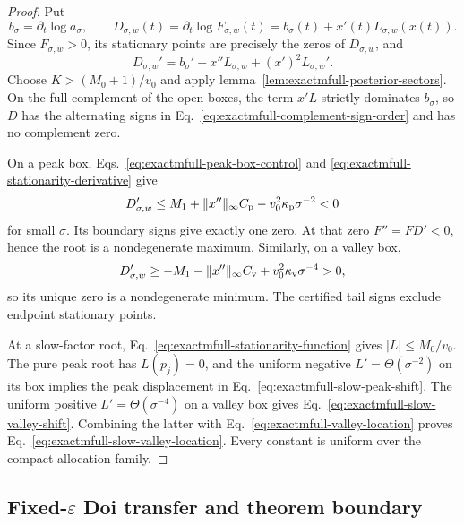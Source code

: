 \documentclass{iopjournal}
\theoremstyle{plain}
\theoremstyle{definition}
\begin{document}
\begin{proof}
Put
\begin{equation}
 b_\sigma=\partial_t\log a_\sigma,
 \qquad
 D_{\sigma,w}(t)=\partial_t\log F_{\sigma,w}(t)
 =b_\sigma(t)+x'(t)L_{\sigma,w}(x(t)).
 \label{eq:exactmfull-stationarity-function}
\end{equation}
Since \(F_{\sigma,w}>0\), its stationary points are precisely the zeros of
\(D_{\sigma,w}\), and
\begin{equation}
 D_{\sigma,w}'
 =b_\sigma'+x''L_{\sigma,w}+(x')^2L_{\sigma,w}'.
 \label{eq:exactmfull-stationarity-derivative}
\end{equation}
Choose \(K>(M_0+1)/v_0\) and apply
lemma~\ref{lem:exactmfull-posterior-sectors}.  On the full complement of the
open boxes, the term \(x'L\) strictly dominates \(b_\sigma\), so \(D\) has
the alternating signs in Eq.~\eqref{eq:exactmfull-complement-sign-order} and
has no complement zero.

On a peak box, Eqs.~\eqref{eq:exactmfull-peak-box-control} and
\eqref{eq:exactmfull-stationarity-derivative} give
\begin{equation}
 D_{\sigma,w}'
 \le M_1+\|x''\|_\infty C_{\rm p}
 -v_0^2\kappa_{\rm p}\sigma^{-2}<0
 \label{eq:exactmfull-peak-root-monotonicity}
\end{equation}
for small \(\sigma\).  Its boundary signs give exactly one zero.  At that
zero \(F''=FD'<0\), hence the root is a nondegenerate maximum.  Similarly,
on a valley box,
\begin{equation}
 D_{\sigma,w}'
 \ge-M_1-\|x''\|_\infty C_{\rm v}
 +v_0^2\kappa_{\rm v}\sigma^{-4}>0,
 \label{eq:exactmfull-valley-root-monotonicity}
\end{equation}
so its unique zero is a nondegenerate minimum.  The certified tail signs
exclude endpoint stationary points.

At a slow-factor root, Eq.~\eqref{eq:exactmfull-stationarity-function} gives
\(|L|\le M_0/v_0\).  The pure peak root has \(L(p_j)=0\), and the uniform
negative \(L'=\Theta(\sigma^{-2})\) on its box implies the peak displacement
in Eq.~\eqref{eq:exactmfull-slow-peak-shift}.  The uniform positive
\(L'=\Theta(\sigma^{-4})\) on a valley box gives
Eq.~\eqref{eq:exactmfull-slow-valley-shift}.  Combining the latter with
Eq.~\eqref{eq:exactmfull-valley-location} proves
Eq.~\eqref{eq:exactmfull-slow-valley-location}.  Every constant is uniform
over the compact allocation family.
\end{proof}

\subsection{Fixed-\texorpdfstring{\(\varepsilon\)}{epsilon} Doi transfer and
theorem boundary}
\label{subsec:exactmfull-doi-transfer}
\end{document}
